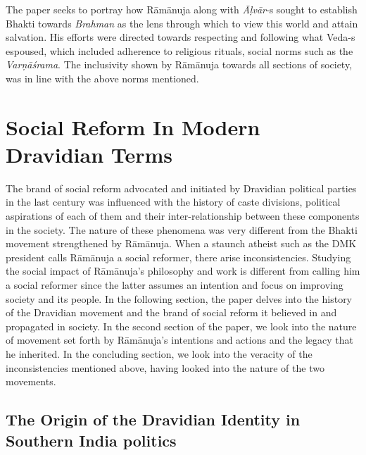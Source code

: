 The paper seeks to portray how Rāmānuja along with \textit{Āḷvār}-s sought to establish Bhakti towards \textit{Brahman }as the lens through which to view this world and attain salvation. His efforts were directed towards respecting and following what Veda-s espoused, which included adherence to religious rituals, social norms such as the \textit{Varņāśrama}. The inclusivity shown by Rāmānuja towards all sections of society, was in line with the above norms mentioned.


\section*{Social Reform In Modern Dravidian Terms}

The brand of social reform advocated and initiated by Dravidian political parties in the last century was influenced with the history of caste divisions, political aspirations of each of them and their inter-relationship between these components in the society. The nature of these phenomena was very different from the Bhakti movement strengthened by Rāmānuja. When a staunch atheist such as the DMK president calls Rāmānuja a social reformer, there arise inconsistencies. Studying the social impact of Rāmānuja’s philosophy and work is different from calling him a social reformer since the latter assumes an intention and focus on improving society and its people. In the following section, the paper delves into the history of the Dravidian movement and the brand of social reform it believed in and propagated in society. In the second section of the paper, we look into the nature of movement set forth by Rāmānuja’s intentions and actions and the legacy that he inherited. In the concluding section, we look into the veracity of the inconsistencies mentioned above, having looked into the nature of the two movements.

\subsection*{The Origin of the Dravidian Identity in Southern India politics}

